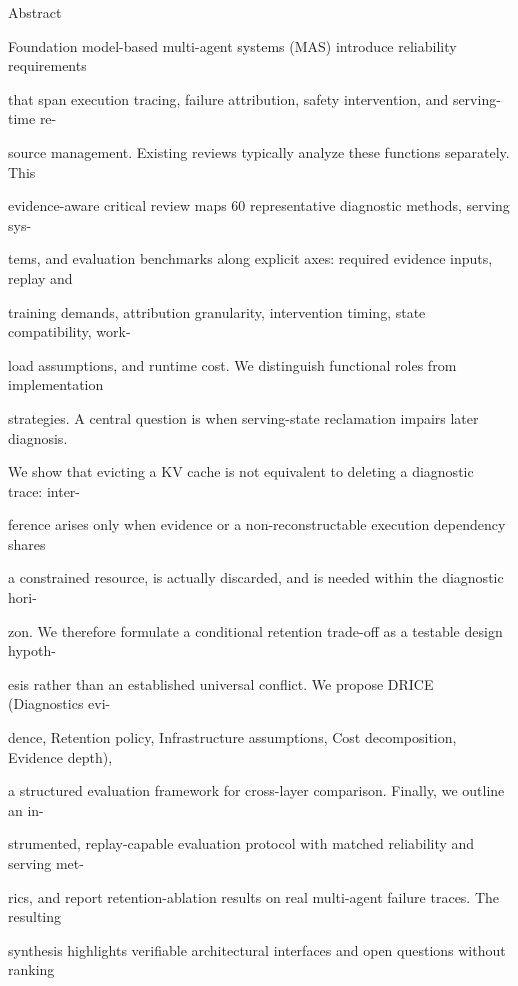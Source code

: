 \begin{flushleft}
\par\smallskip
\noindent  Abstract\par
\noindent  Foundation model-based multi-agent systems (MAS) introduce reliability requirements\par
\noindent  that span execution tracing, failure attribution, safety intervention, and serving-time re-\par
\noindent  source management. Existing reviews typically analyze these functions separately. This\par
\noindent  evidence-aware critical review maps 60 representative diagnostic methods, serving sys-\par
\noindent  tems, and evaluation benchmarks along explicit axes: required evidence inputs, replay and\par
\noindent  training demands, attribution granularity, intervention timing, state compatibility, work-\par
\noindent  load assumptions, and runtime cost. We distinguish functional roles from implementation\par
\noindent  strategies. A central question is when serving-state reclamation impairs later diagnosis.\par
\noindent  We show that evicting a KV cache is not equivalent to deleting a diagnostic trace: inter-\par
\noindent  ference arises only when evidence or a non-reconstructable execution dependency shares\par
\noindent  a constrained resource, is actually discarded, and is needed within the diagnostic hori-\par
\noindent  zon. We therefore formulate a conditional retention trade-off as a testable design hypoth-\par
\noindent  esis rather than an established universal conflict. We propose DRICE (Diagnostics evi-\par
\noindent  dence, Retention policy, Infrastructure assumptions, Cost decomposition, Evidence depth),\par
\noindent  a structured evaluation framework for cross-layer comparison. Finally, we outline an in-\par
\noindent  strumented, replay-capable evaluation protocol with matched reliability and serving met-\par
\noindent  rics, and report retention-ablation results on real multi-agent failure traces. The resulting\par
\noindent  synthesis highlights verifiable architectural interfaces and open questions without ranking\par

\end{flushleft}
